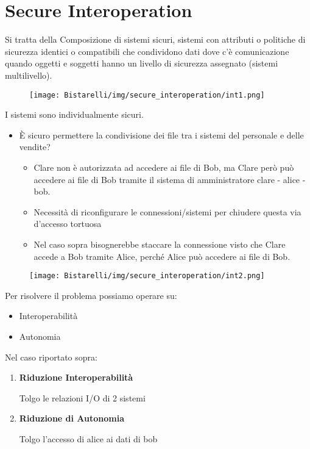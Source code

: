 \chapter*{Secure Interoperation}
Si tratta della Composizione di sistemi sicuri, sistemi con attributi o politiche di sicurezza identici o compatibili che condividono dati dove c'è comunicazione quando oggetti e soggetti hanno un livello di sicurezza assegnato (sistemi multilivello). 

\begin{figure}[H]
	\centering
    \texttt{[image: Bistarelli/img/secure\_interoperation/int1.png]}
\end{figure}

I sistemi sono individualmente sicuri.
\begin{itemize}
    \item È sicuro permettere la condivisione dei file tra i sistemi del personale e delle vendite?
    
    \begin{itemize}
        \item Clare non è autorizzata ad accedere ai file di Bob, ma Clare però può accedere ai file di Bob tramite il sistema di amministratore clare - alice - bob.
        
        \item Necessità di riconfigurare le connessioni/sistemi per chiudere questa via d'accesso tortuosa
        
        \item Nel caso sopra bisognerebbe staccare la connessione visto che Clare accede a Bob tramite Alice, perché Alice può accedere ai file di Bob.
    \end{itemize}
\end{itemize}

\begin{figure}[H]
	\centering
    \texttt{[image: Bistarelli/img/secure\_interoperation/int2.png]}
\end{figure}

Per risolvere il problema possiamo operare su:
\begin{itemize}
    \item Interoperabilità
    
    \item Autonomia
\end{itemize}
Nel caso riportato sopra:
\begin{enumerate}
    \item \textbf{Riduzione Interoperabilità}
    
    Tolgo le relazioni I/O di 2 sistemi 
    
    \item \textbf{Riduzione di Autonomia}
    
    Tolgo l'accesso di alice ai dati di bob
\end{enumerate}

